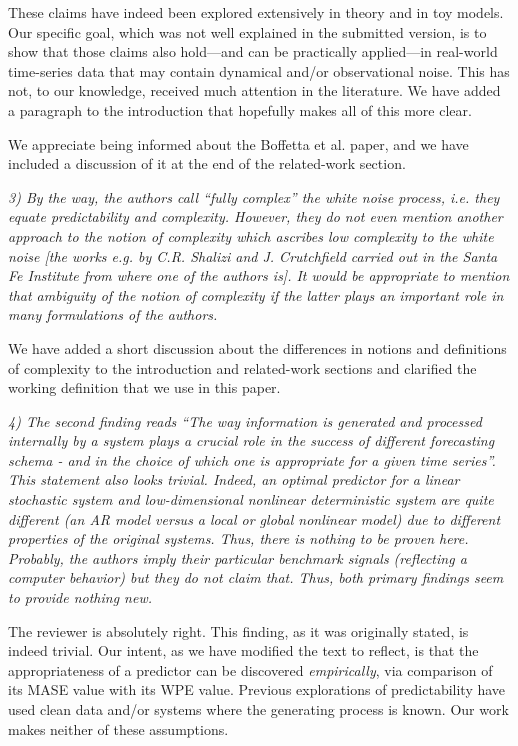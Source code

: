 \documentclass[12pt]{article}
\begin{document}
These claims have indeed been explored extensively in theory and in
toy models.  Our specific goal, which was not well explained in the
submitted version, is to show that those claims also hold---and can be
practically applied---in real-world time-series data that may contain
dynamical and/or observational noise.  This has not, to our knowledge,
received much attention in the literature.  We have added a paragraph
to the introduction that hopefully makes all of this more clear.

We appreciate being informed about the Boffetta et al.  paper, and we
have included a discussion of it at the end of the related-work
section.

\smallskip

\emph{3) By the way, the authors call ``fully complex'' the white
  noise process, i.e. they equate predictability and
  complexity. However, they do not even mention another approach to
  the notion of complexity which ascribes low complexity to the white
  noise [the works e.g. by C.R. Shalizi and J. Crutchfield carried out
    in the Santa Fe Institute from where one of the authors is]. It
  would be appropriate to mention that ambiguity of the notion of
  complexity if the latter plays an important role in many
  formulations of the authors.}

We have added a short discussion about the differences in notions and
definitions of complexity to the introduction and related-work
sections and clarified the working definition that we use in this
paper.

\smallskip

\emph{4) The second finding reads ``The way information is generated
  and processed internally by a system plays a crucial role in the
  success of different forecasting schema - and in the choice of which
  one is appropriate for a given time series''. This statement also
  looks trivial. Indeed, an optimal predictor for a linear stochastic
  system and low-dimensional nonlinear deterministic system are quite
  different (an AR model versus a local or global nonlinear model) due
  to different properties of the original systems. Thus, there is
  nothing to be proven here. Probably, the authors imply their
  particular benchmark signals (reflecting a computer behavior) but
  they do not claim that.  Thus, both primary findings seem to provide
  nothing new.}

The reviewer is absolutely right.  This finding, as it was originally
stated, is indeed trivial.  Our intent, as we have modified the text
to reflect, is that the appropriateness of a predictor can be
discovered \emph{empirically}, via comparison of its MASE value with
its WPE value.  Previous explorations of predictability have used
clean data and/or systems where the generating process is known.  Our
work makes neither of these assumptions.
\end{document}
